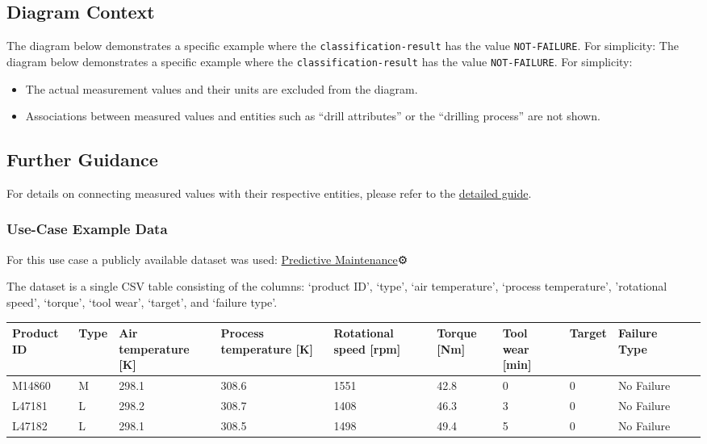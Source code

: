 \subsection*{Diagram Context}  
The diagram below demonstrates a specific example where the \texttt{classification-result} has the value \texttt{NOT-FAILURE}. For simplicity:
The diagram below demonstrates a specific example where the \texttt{classification-result} has the value \texttt{NOT-FAILURE}. For simplicity:
\begin{itemize}
    \item The actual measurement values and their units are excluded from the diagram.
    \item Associations between measured values and entities such as “drill attributes” or the “drilling process” are not shown.
\end{itemize}

\subsection*{Further Guidance}  
For details on connecting measured values with their respective entities, please refer to the \href{placeholder link}{detailed guide}.  

\subsubsection*{Use-Case Example Data}

For this use case a publicly available dataset was used: \href{https://www.kaggle.com/code/zakikurdya/predictive-maintenance}{Predictive Maintenance}⚙️ 

The dataset is a single CSV table consisting of the columns: ‘product ID’, ‘type’, ‘air temperature’, ‘process temperature’, ’rotational speed’, ‘torque’, ‘tool wear’, ‘target’, and ‘failure type’.

\begin{tabularx}{\textwidth}{|l|X|X|X|X|X|X|X|X|X|X|}
\hline
Product ID & Type & Air temperature {[}K{]} & Process temperature {[}K{]} & Rotational speed {[}rpm{]} & Torque {[}Nm{]} & Tool wear {[}min{]} & Target & Failure Type \\ \hline
M14860     & M    & 298.1                   & 308.6                       & 1551                       & 42.8            & 0                   & 0      & No Failure   \\
L47181     & L    & 298.2                   & 308.7                       & 1408                       & 46.3            & 3                   & 0      & No Failure   \\
L47182     & L    & 298.1                   & 308.5                       & 1498                       & 49.4            & 5                   & 0      & No Failure   \\ \hline
\end{tabularx}

